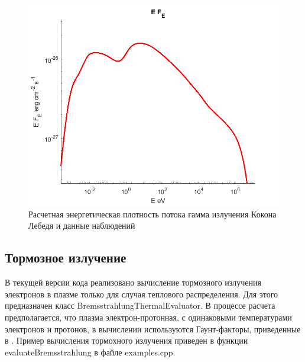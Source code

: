 \begin{figure}
	\centering
	\includegraphics[width=12.5 cm]{./fig/compton.png} 
	\caption{Расчетная энергетическая плотность потока гамма излучения Кокона Лебедя и данные наблюдений}
	\label{pion}
\end{figure}
\subsection{Тормозное излучение}
В текущей версии кода реализовано вычисление тормозного излучения электронов в плазме только для случая теплового распределения. Для этого предназначен класс BremsstrahlungThermalEvaluator. В процессе расчета предполагается, что плазма электрон-протонная, с одинаковыми температурами электронов и протонов, в вычислении используются Гаунт-факторы, приведенные в \cite{Rybicki}. Пример вычисления тормохного излучения приведен в функции evaluateBremsstrahlung в файле examples.cpp.

